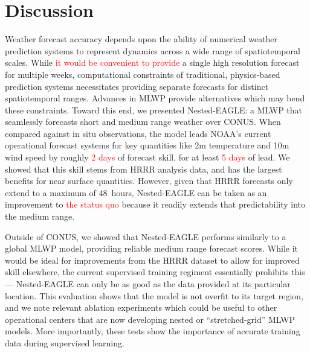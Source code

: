 \documentclass[11pt]{article}
\newcommand{\red}[1]{\textcolor{red}{#1}}
\begin{document}
\section{Discussion}
\label{sec:discussion}

Weather forecast accuracy depends upon the ability of numerical weather
prediction systems to represent dynamics across a wide range of spatiotemporal
scales.
While \red{it would be convenient to provide} a single high resolution forecast for
multiple weeks,
computational constraints of traditional, physics-based prediction systems
necessitates providing separate forecasts for distinct spatiotemporal ranges.
Advances in MLWP provide alternatives which may bend these constraints.
Toward this end, we presented Nested-EAGLE: a MLWP that seamlessly forecasts short and
medium range weather over CONUS.
When compared against in situ observations, the model leads NOAA's current operational
forecast systems for key quantities like 2m temperature and 10m wind speed
by roughly \red{2 days} of forecast skill, for at least \red{5 days} of lead.
We showed that this skill stems from HRRR analysis data, and has the largest
benefits for near surface quantities.
However, given that HRRR forecasts only extend to a maximum of 48~hours, Nested-EAGLE
can be taken as an improvement to \red{the status quo} because it readily extends that
predictability into the medium range.

Outside of CONUS, we showed that Nested-EAGLE performs similarly to a global
MLWP model, providing reliable medium range forecast scores.
While it would be ideal for improvements from the HRRR dataset to allow for
improved skill elsewhere, the current supervised training regiment essentially
prohibits this --- Nested-EAGLE can only be as good as the data provided at its
particular location.
This evaluation shows that the model is not overfit to its target region, and we
note relevant ablation experiments which could be useful to other operational
centers that are now developing nested or ``stretched-grid'' MLWP models.
More importantly, these tests show the importance of accurate training data
during supervised learning.
\end{document}
